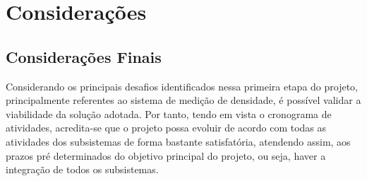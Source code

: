 \chapter[Considerações]{Considerações}

\section{Considerações Finais}

Considerando os principais desafios identificados nessa primeira etapa do projeto, principalmente referentes ao sistema de medição de densidade, é possível validar a viabilidade da solução adotada. Por tanto, tendo em vista o cronograma de atividades, acredita-se que o projeto possa evoluir de acordo com todas as atividades dos subsistemas de forma bastante satisfatória, atendendo assim, aos prazos pré determinados do objetivo principal do projeto, ou seja, haver a integração de todos os subsistemas.
